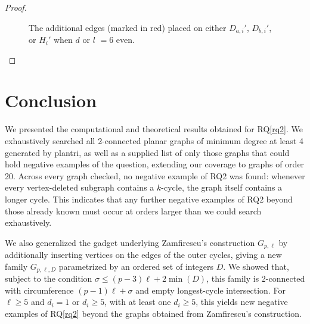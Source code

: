 \begin{proof}
\begin{figure}
  \caption{The additional edges (marked in red) placed on either $D_{a,i}'$, $D_{b,i}'$, or $H_i'$ when $d$ or $l$ $=6$ even.}
  \label{fig:degree-4-same-side}
\end{figure}

\end{proof}

\section{Conclusion}
We presented the computational and theoretical results obtained for RQ\ref{rq2}. We exhaustively searched all 2-connected planar graphs of minimum degree at least 4 generated by plantri, as well as a supplied list of only those graphs that could hold negative examples of the question, extending our coverage to graphs of order 20. Across every graph checked, no negative example of RQ2 was found: whenever every vertex-deleted subgraph contains a $k$-cycle, the graph itself contains a longer cycle. This indicates that any further negative examples of RQ2 beyond those already known must occur at orders larger than we could search exhaustively.

We also generalized the gadget underlying Zamfirescu's construction $G_{p,\ell}$ by additionally inserting vertices on the edges of the outer cycles, giving a new family $G_{p,\ell,D}$ parametrized by an ordered set of integers $D$. We showed that, subject to the condition $\sigma \le (p-3)\ell + 2\min(D)$, this family is 2-connected with circumference $(p-1)\ell + \sigma$ and empty longest-cycle intersection. For $\ell \ge 5$ and $d_i = 1$ or $d_i \ge 5$, with at least one $d_i \ge 5$, this yields new negative examples of RQ\ref{rq2} beyond the graphs obtained from Zamfirescu's construction.
